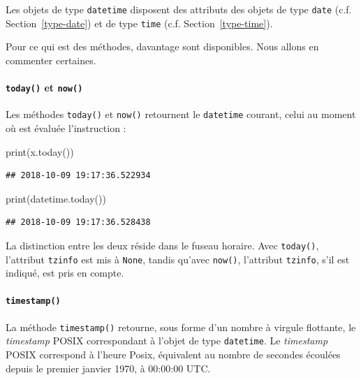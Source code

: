 \documentclass[12pt,]{book}
\newenvironment{Shaded}{\begin{snugshade}}{\end{snugshade}}
\newcommand{\BuiltInTok}[1]{#1}
\newcommand{\NormalTok}[1]{#1}
\let\oldparagraph\paragraph
\renewcommand{\paragraph}[1]{\oldparagraph{#1}\mbox{}}
\numberwithin{equation}{section}
\numberwithin{countremarque}{section}
\begin{document}
Les objets de type \texttt{datetime} disposent des attributs des objets
de type \texttt{date} (c.f. Section~\ref{type-date}) et de type
\texttt{time} (c.f. Section~\ref{type-time}).

Pour ce qui est des méthodes, davantage sont disponibles. Nous allons en
commenter certaines.

\paragraph{\texorpdfstring{\texttt{today()} et
\texttt{now()}}{today() et now()}}\label{today-et-now}

Les méthodes \texttt{today()} et \texttt{now()} retournent le
\texttt{datetime} courant, celui au moment où est évaluée l'instruction
:

\begin{Shaded}
\begin{Highlighting}[]
\BuiltInTok{print}\NormalTok{(x.today())}
\end{Highlighting}
\end{Shaded}

\begin{lstlisting}
## 2018-10-09 19:17:36.522934
\end{lstlisting}

\begin{Shaded}
\begin{Highlighting}[]
\BuiltInTok{print}\NormalTok{(datetime.today())}
\end{Highlighting}
\end{Shaded}

\begin{lstlisting}
## 2018-10-09 19:17:36.528438
\end{lstlisting}

La distinction entre les deux réside dans le fuseau horaire. Avec
\texttt{today()}, l'attribut \texttt{tzinfo} est mis à \texttt{None},
tandis qu'avec \texttt{now()}, l'attribut \texttt{tzinfo}, s'il est
indiqué, est pris en compte.

\paragraph{\texorpdfstring{\texttt{timestamp()}}{timestamp()}}\label{timestamp}

La méthode \texttt{timestamp()} retourne, sous forme d'un nombre à
virgule flottante, le \emph{timestamp} POSIX correspondant à l'objet de
type \texttt{datetime}. Le \emph{timestamp} POSIX correspond à l'heure
Posix, équivalent au nombre de secondes écoulées depuis le premier
janvier 1970, à 00:00:00 UTC.
\end{document}

